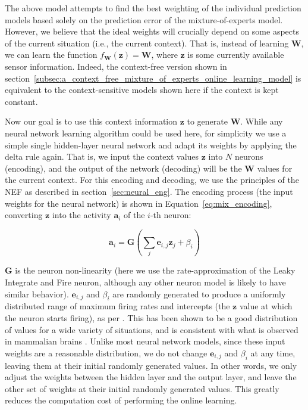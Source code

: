 The above model attempts to find the best weighting of the individual prediction models based solely on the prediction error of the mixture-of-experts model.
However, we believe that the ideal weights will crucially depend on some aspects of the current situation (i.e., the current context).
That is, instead of learning $ \mathbf{W}$, we can learn the function $f_{ \mathbf{W}}( \mathbf{z})= \mathbf{W}$, where $\mathbf{z}$ is some currently available sensor information.
Indeed, the context-free version shown in section~\ref{subsec:a_context_free_mixture_of_experts_online_learning_model} is equivalent to the context-sensitive models shown here if the context is kept constant.

Now our goal is to use this context information $\mathbf{z}$ to generate $\mathbf{W}$.
While any neural network learning algorithm could be used here, for simplicity we use a simple single hidden-layer neural network and adapt its weights by applying the delta rule again.
That is, we input the context values $\mathbf{z}$ into $N$ neurons (encoding), and the output of the network (decoding) will be the $\mathbf{W}$ values for the current context.
For this encoding and decoding, we use the principles of the \acf{NEF} as described in section~\ref{sec:neural_eng}.
The encoding process (the input weights for the neural network) is shown in Equation~\eqref{eq:mix_encoding}, converting $\mathbf{z}$ into the activity $\mathbf{a}_i$ of the $i$-th neuron:

\begin{equation}
  \mathbf{a}_{i} = \mathbf{G} \left(\sum_{j} \mathbf{e}_{i,j}\mathbf{z}_j+\beta_i\right)
  \label{eq:mix_encoding}
\end{equation}

$\mathbf{G}$ is the neuron non-linearity (here we use the rate-approximation of the Leaky Integrate and Fire neuron, although any other neuron model is likely to have similar behavior).
$\mathbf{e}_{i,j}$ and $\beta_i$ are randomly generated to produce a uniformly distributed range of maximum firing rates and intercepts (the $\mathbf{z}$ value at which the neuron starts firing), as per \textcite{Eliasmith2013}. 
This has been shown to be a good distribution of values for a wide variety of situations, and is consistent with what is observed in mammalian brains \parencite{Eliasmith2013}.
Unlike most neural network models, since these input weights are a reasonable distribution, we do not change $\mathbf{e}_{i,j}$ and $\beta_i$ at any time, leaving them at their initial randomly generated values.
In other words, we only adjust the weights between the hidden layer and the output layer, and leave the other set of weights at their initial randomly generated values.
This greatly reduces the computation cost of performing the online learning.

